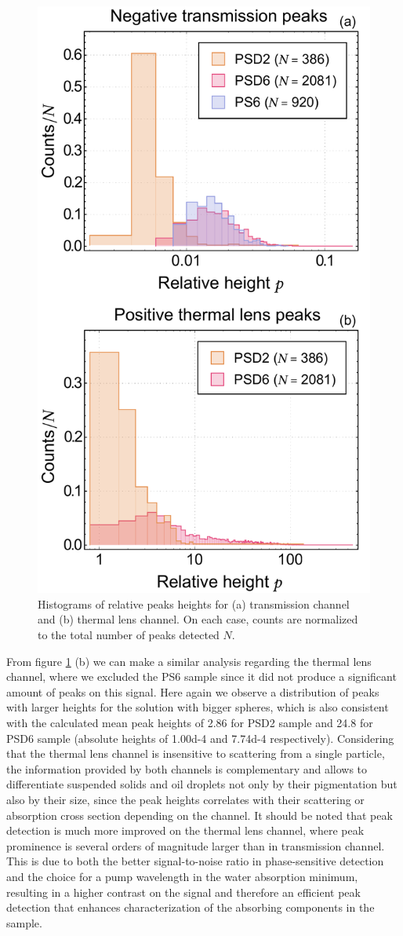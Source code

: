 \documentclass[10pt,authoryear,twocolumn]{article}
\begin{document}
\begin{figure}[t!]
	\centering \includegraphics[width=.49\textwidth]{Figuras/PeakHeightDistribution.pdf}
	\caption{Histograms of relative peaks heights for (a) transmission channel and (b) thermal lens channel. On each case, counts are normalized to the total number of peaks detected $N$.}
	\label{fig:PeakHistogram}
\end{figure}

From figure \ref{fig:PeakHistogram} (b) we can make a similar analysis regarding the thermal lens channel, where we excluded the PS6 sample since it did not produce a significant amount of peaks on this signal. Here again we observe a distribution of peaks with larger heights for the solution with bigger spheres, which is also consistent with the calculated mean peak heights of \SI{2.86}{} for PSD2 sample and \SI{24.8}{} for PSD6 sample (absolute heights of \SI{1.00d-4}{} and \SI{7.74d-4}{} respectively). Considering that the thermal lens channel is insensitive to scattering from a single particle, the information provided by both channels is complementary and allows to differentiate suspended solids and oil droplets not only by their pigmentation but also by their size, since the peak heights correlates with their scattering or absorption cross section depending on the channel. It should be noted that peak detection is much more improved on the thermal lens channel, where peak prominence is several orders of magnitude larger than in transmission channel. This is due to both the better signal-to-noise ratio in phase-sensitive detection and the choice for a pump wavelength in the water absorption minimum, resulting in a higher contrast on the signal and therefore an efficient peak detection that enhances characterization of the absorbing components in the sample. \\
\end{document}
